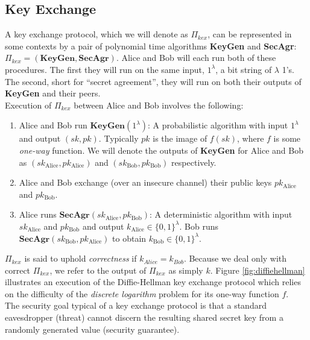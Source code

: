 \subsection{Key Exchange}

A key exchange protocol, which we will denote as $\Pi_{kex}$, can be represented in some contexts by a pair of polynomial time algorithms \textbf{KeyGen} and \textbf{SecAgr}: $\Pi_{kex} = (\textbf{KeyGen},\textbf{SecAgr})$. Alice and Bob will each run both of these procedures. The first they will run on the same input, $1^\lambda$, a bit string of $\lambda$ 1's. The second, short for ``secret agreement'', they will run on both their outputs of \textbf{KeyGen} and their peers.\\

Execution of $\Pi_{kex}$ between Alice and Bob involves the following:
\begin{enumerate}[label=(\roman*)]
\item Alice and Bob run $\textbf{KeyGen}(1^\lambda)$: A probabilistic algorithm with input $1^\lambda$ and output $(sk,pk)$. Typically $pk$ is the image of $f(sk)$, where $f$ is some \emph{one-way} function. We will denote the outputs of \textbf{KeyGen} for Alice and Bob as $(sk_{\text{Alice}},pk_{\text{Alice}})$ and $(sk_{\text{Bob}},pk_{\text{Bob}})$ respectively.
\item Alice and Bob exchange (over an insecure channel) their public keys $pk_{\text{Alice}}$ and $pk_{\text{Bob}}$.
\item Alice runs $\textbf{SecAgr}(sk_{\text{Alice}}, pk_{\text{Bob}})$: A deterministic algorithm with input $sk_{\text{Alice}}$ and $pk_{\text{Bob}}$ and output $k_{\text{Alice}} \in \{0,1\}^\lambda$. Bob runs $\textbf{SecAgr}(sk_{\text{Bob}}, pk_{\text{Alice}})$ to obtain $k_{\text{Bob}} \in \{0,1\}^\lambda$.
\end{enumerate}

$\Pi_{kex}$ is said to uphold \emph{correctness} if $k_{Alice} = k_{Bob}$. Because we deal only with correct $\Pi_{kex}$, we refer to the output of $\Pi_{kex}$ as simply $k$. Figure \ref{fig:diffiehellman} illustrates an execution of the Diffie-Hellman key exchange protocol which relies on the difficulty of the \emph{discrete logarithm} problem for its one-way function $f$.\\

The security goal typical of a key exchange protocol is that a standard eavesdropper (threat) cannot discern the resulting shared secret key from a randomly generated value (security guarantee).

